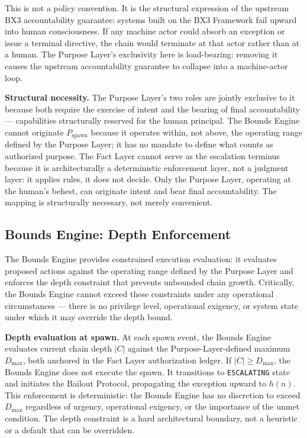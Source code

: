 This is not a policy convention. It is the structural expression of the upstream BX3 accountability guarantee: systems built on the BX3 Framework fail upward into human consciousness. If any machine actor could absorb an exception or issue a terminal directive, the chain would terminate at that actor rather than at a human. The Purpose Layer's exclusivity here is load-bearing: removing it causes the upstream accountability guarantee to collapse into a machine-actor loop.

\medskip
\noindent\textbf{Structural necessity.} The Purpose Layer's two roles are jointly exclusive to it because both require the exercise of intent and the bearing of final accountability --- capabilities structurally reserved for the human principal. The Bounds Engine cannot originate $P_{\mathrm{spawn}}$ because it operates within, not above, the operating range defined by the Purpose Layer; it has no mandate to define what counts as authorized purpose. The Fact Layer cannot serve as the escalation terminus because it is architecturally a deterministic enforcement layer, not a judgment layer: it applies rules, it does not decide. Only the Purpose Layer, operating at the human's behest, can originate intent and bear final accountability. The mapping is structurally necessary, not merely convenient.

\subsection{Bounds Engine: Depth Enforcement}
\label{sec:rs-bounds-depth}

The Bounds Engine provides constrained execution evaluation: it evaluates proposed actions against the operating range defined by the Purpose Layer and enforces the depth constraint that prevents unbounded chain growth. Critically, the Bounds Engine cannot exceed these constraints under any operational circumstances --- there is no privilege level, operational exigency, or system state under which it may override the depth bound.

\medskip
\noindent\textbf{Depth evaluation at spawn.} At each spawn event, the Bounds Engine evaluates current chain depth $|C|$ against the Purpose-Layer-defined maximum $D_{\mathrm{max}}$, both anchored in the Fact Layer authorization ledger. If $|C| \geq D_{\mathrm{max}}$, the Bounds Engine does not execute the spawn. It transitions to \texttt{ESCALATING} state and initiates the Bailout Protocol, propagating the exception upward to $h(n)$. This enforcement is deterministic: the Bounds Engine has no discretion to exceed $D_{\mathrm{max}}$ regardless of urgency, operational exigency, or the importance of the unmet condition. The depth constraint is a hard architectural boundary, not a heuristic or a default that can be overridden.

